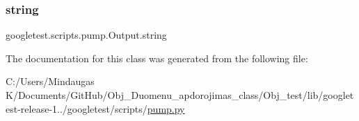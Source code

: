 \subsubsection{\texorpdfstring{string}{string}}
{\footnotesize\ttfamily googletest.\+scripts.\+pump.\+Output.\+string}



The documentation for this class was generated from the following file\+:\begin{DoxyCompactItemize}
\item 
C\+:/\+Users/\+Mindaugas K/\+Documents/\+Git\+Hub/\+Obj\+\_\+\+Duomenu\+\_\+apdorojimas\+\_\+class/\+Obj\+\_\+test/lib/googletest-\/release-\/1../googletest/scripts/\mbox{\hyperlink{_obj__test_2lib_2googletest-release-1_88_81_2googletest_2scripts_2pump_8py}{pump.\+py}}\end{DoxyCompactItemize}

